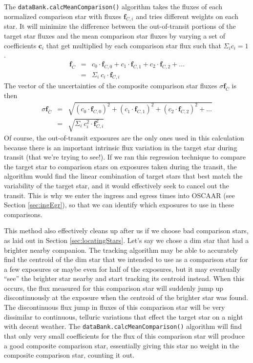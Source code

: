 \documentclass[a4paper]{article}
\newcommand{\code}[1]{\texttt{#1}}
\begin{document}
The \code{dataBank.calcMeanComparison()} algorithm takes the fluxes of each normalized comparison star with fluxes $\mathbf{f}_{C,i}$ and tries different weights on each star. It will minimize the difference between the out-of-transit portions of the target star fluxes and the mean comparison star fluxes by varying a set of coefficients $\mathbf{c}_i$ that get multiplied by each comparison star flux such that $\Sigma_i c_i = 1$.
\begin{eqnarray} 
\mathbf{f}_{\bar{C}} &=& c_0 \cdot \mathbf{f}_{C,0}  + c_1 \cdot \mathbf{f}_{C,1} + c_2 \cdot \mathbf{f}_{C,2} + ...\\
    &=& \Sigma_i ~ c_i \cdot \mathbf{f}_{C,i}
\end{eqnarray}
The vector of the uncertainties of the composite comparison star fluxes $\sigma \mathbf{f}_{\bar{C}}$ is then
\begin{eqnarray} 
\sigma \mathbf{f}_{\bar{C}} &=& \sqrt{ \left( c_0 \cdot \mathbf{f}_{C,0} \right)^2  + \left(  c_1 \cdot \mathbf{f}_{C,1} \right)^2+ \left( c_2 \cdot \mathbf{f}_{C,2} \right)^2+ ...} \\
     &=& \sqrt{ \Sigma_i ~ c_i^2 \cdot \mathbf{f}_{C,i}^2}
\end{eqnarray}
Of course, the out-of-transit exposures are the only ones used in this calculation because there is an important intrinsic flux variation in the target star during transit (that we're trying to see!). If we ran this regression technique to compare the target star to comparison stars on exposures taken during the transit, the algorithm would find the linear combination of target stars that best match the variability of the target star, and it would effectively seek to cancel out the transit. This is why we enter the ingress and egress times into OSCAAR (see Section \ref{sec:ingEgr}), so that we can identify which exposures to use in these comparisons. 

This method also effectively cleans up after us if we choose bad comparison stars, as laid out in Section \ref{sec:locatingStars}. Let's say we chose a dim star that had a brighter nearby companion. The tracking algorithm may be able to accurately find the centroid of the dim star that we intended to use as a comparison star for a few exposures or maybe even for half of the exposures, but it may eventually ``see'' the brighter star nearby and start tracking its centroid instead. When this occurs, the flux measured for this comparison star will suddenly jump up discontinuously at the exposure when the centroid of the brighter star was found. The discontinuous flux jump in fluxes of this comparison star will be very dissimilar to continuous, telluric variations that effect the target star on a night with decent weather. The \code{dataBank.calcMeanComparison()} algorithm will find that only very small coefficients for the flux of this comparison star will produce a good composite comparison star, essentially giving this star no weight in the composite comparison star, counting it out. 
\end{document}
